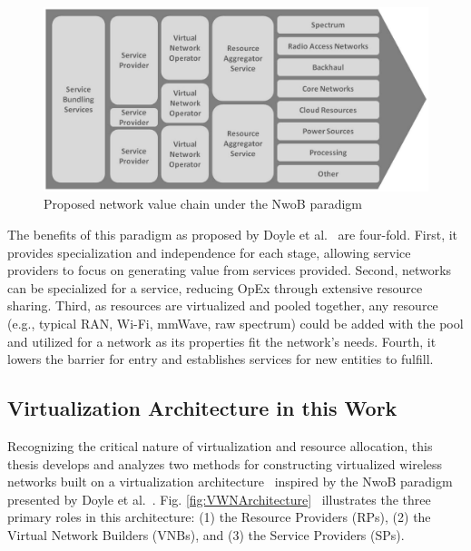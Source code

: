 \documentclass[12pt,dvipsnames]{report}
\begin{document}
\begin{figure}
	\centering
	\includegraphics[width=\linewidth]{NwoBValueChain}
	\caption[Proposed network value chain under the NwoB paradigm]{\small Proposed network value chain under the NwoB paradigm~\cite{6737248}}
	\label{fig:NwoBValueChain}
\end{figure}

The benefits of this paradigm as proposed by Doyle et al.~\cite{6737248} are four-fold.  First, it provides specialization and independence for each stage, allowing service providers to focus on generating value from services provided.  Second, networks can be specialized for a service, reducing OpEx through extensive resource sharing.  Third, as resources are virtualized and pooled together, any resource (e.g., typical RAN, Wi-Fi, mmWave, raw spectrum) could be added with the pool and utilized for a network as its properties fit the network's needs.  Fourth, it lowers the barrier for entry and establishes services for new entities to fulfill.

\subsection{Virtualization Architecture in this Work} \label{subsec:virtualization_architecture}

Recognizing the critical nature of virtualization and resource allocation, this thesis develops and analyzes two methods for constructing virtualized wireless networks built on a virtualization architecture~\cite{MJ_CCNC_16, MJ_MECOMM_17} inspired by the NwoB paradigm presented by Doyle et al.~\cite{6737248}.  Fig. \ref{fig:VWNArchitecture}~\cite{MJ_CCNC_16, MJ_MECOMM_17} illustrates the three primary roles in this architecture: (1) the Resource Providers (RPs), (2) the Virtual Network Builders (VNBs), and (3) the Service Providers (SPs).
\end{document}
